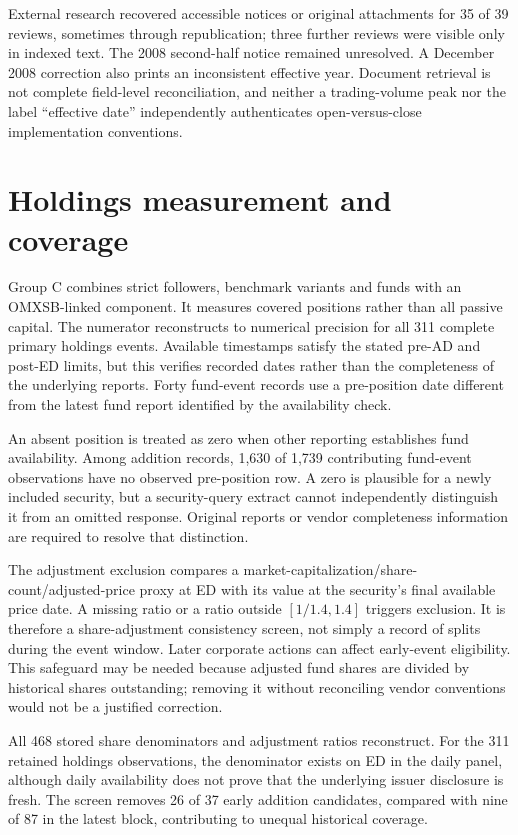 External research recovered accessible notices or original attachments for 35 of 39 reviews, sometimes through republication; three further reviews were visible only in indexed text. The 2008 second-half notice remained unresolved. A December 2008 correction also prints an inconsistent effective year. Document retrieval is not complete field-level reconciliation, and neither a trading-volume peak nor the label ``effective date'' independently authenticates open-versus-close implementation conventions.
\FloatBarrier

\section{Holdings measurement and coverage}
\label{app:holdings}

Group C combines strict followers, benchmark variants and funds with an OMXSB-linked component. It measures covered positions rather than all passive capital. The numerator reconstructs to numerical precision for all 311 complete primary holdings events. Available timestamps satisfy the stated pre-AD and post-ED limits, but this verifies recorded dates rather than the completeness of the underlying reports. Forty fund-event records use a pre-position date different from the latest fund report identified by the availability check.

An absent position is treated as zero when other reporting establishes fund availability. Among addition records, 1,630 of 1,739 contributing fund-event observations have no observed pre-position row. A zero is plausible for a newly included security, but a security-query extract cannot independently distinguish it from an omitted response. Original reports or vendor completeness information are required to resolve that distinction.

The adjustment exclusion compares a market-capitalization/share-count/adjusted-price proxy at ED with its value at the security's final available price date. A missing ratio or a ratio outside $[1/1.4,1.4]$ triggers exclusion. It is therefore a share-adjustment consistency screen, not simply a record of splits during the event window. Later corporate actions can affect early-event eligibility. This safeguard may be needed because adjusted fund shares are divided by historical shares outstanding; removing it without reconciling vendor conventions would not be a justified correction.



All 468 stored share denominators and adjustment ratios reconstruct. For the 311 retained holdings observations, the denominator exists on ED in the daily panel, although daily availability does not prove that the underlying issuer disclosure is fresh. The screen removes 26 of 37 early addition candidates, compared with nine of 87 in the latest block, contributing to unequal historical coverage.

